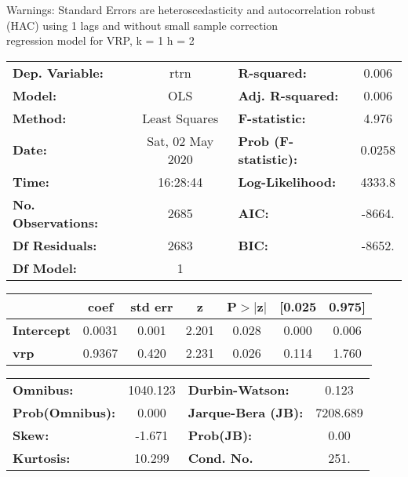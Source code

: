 Warnings: \newline
 [1] Standard Errors are heteroscedasticity and autocorrelation robust (HAC) using 1 lags and without small sample correction\\ 

regression model for VRP, k = 1 h = 2\begin{center}
\begin{tabular}{lclc}
\toprule
\textbf{Dep. Variable:}    &       rtrn       & \textbf{  R-squared:         } &     0.006   \\
\textbf{Model:}            &       OLS        & \textbf{  Adj. R-squared:    } &     0.006   \\
\textbf{Method:}           &  Least Squares   & \textbf{  F-statistic:       } &     4.976   \\
\textbf{Date:}             & Sat, 02 May 2020 & \textbf{  Prob (F-statistic):} &   0.0258    \\
\textbf{Time:}             &     16:28:44     & \textbf{  Log-Likelihood:    } &    4333.8   \\
\textbf{No. Observations:} &        2685      & \textbf{  AIC:               } &    -8664.   \\
\textbf{Df Residuals:}     &        2683      & \textbf{  BIC:               } &    -8652.   \\
\textbf{Df Model:}         &           1      & \textbf{                     } &             \\
\bottomrule
\end{tabular}
\begin{tabular}{lcccccc}
                   & \textbf{coef} & \textbf{std err} & \textbf{z} & \textbf{P$> |$z$|$} & \textbf{[0.025} & \textbf{0.975]}  \\
\midrule
\textbf{Intercept} &       0.0031  &        0.001     &     2.201  &         0.028        &        0.000    &        0.006     \\
\textbf{vrp}       &       0.9367  &        0.420     &     2.231  &         0.026        &        0.114    &        1.760     \\
\bottomrule
\end{tabular}
\begin{tabular}{lclc}
\textbf{Omnibus:}       & 1040.123 & \textbf{  Durbin-Watson:     } &    0.123  \\
\textbf{Prob(Omnibus):} &   0.000  & \textbf{  Jarque-Bera (JB):  } & 7208.689  \\
\textbf{Skew:}          &  -1.671  & \textbf{  Prob(JB):          } &     0.00  \\
\textbf{Kurtosis:}      &  10.299  & \textbf{  Cond. No.          } &     251.  \\
\bottomrule
\end{tabular}
\end{center}

